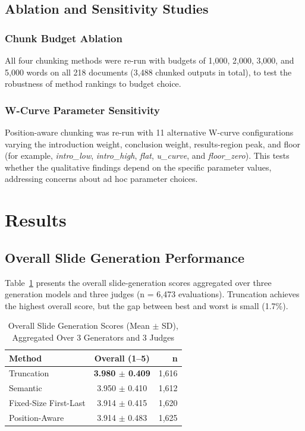 \documentclass{ieeeaccess}
\begin{document}
\subsection{Ablation and Sensitivity Studies}

\subsubsection{Chunk Budget Ablation}

All four chunking methods were re-run with budgets of 1,000, 2,000, 3,000, and 5,000 words on all 218 documents (3,488 chunked outputs in total), to test the robustness of method rankings to budget choice.

\subsubsection{W-Curve Parameter Sensitivity}

Position-aware chunking was re-run with 11 alternative W-curve configurations varying the introduction weight, conclusion weight, results-region peak, and floor (for example, \emph{intro\_low}, \emph{intro\_high}, \emph{flat}, \emph{u\_curve}, and \emph{floor\_zero}). This tests whether the qualitative findings depend on the specific parameter values, addressing concerns about ad hoc parameter choices.

\section{Results}
\label{sec:results}

\subsection{Overall Slide Generation Performance}

Table~\ref{tab:results} presents the overall slide-generation scores aggregated over three generation models and three judges (n = 6,473 evaluations). Truncation achieves the highest overall score, but the gap between best and worst is small (1.7\%).

\begin{table}[h]
\caption{Overall Slide Generation Scores (Mean $\pm$ SD), Aggregated Over 3 Generators and 3 Judges}
\label{tab:results}
\centering
\begin{tabular}{|l|c|r|}
\hline
\textbf{Method} & \textbf{Overall (1--5)} & \textbf{n} \\
\hline
Truncation & \textbf{3.980 $\pm$ 0.409} & 1,616 \\
Semantic & 3.950 $\pm$ 0.410 & 1,612 \\
Fixed-Size First-Last & 3.914 $\pm$ 0.415 & 1,620 \\
Position-Aware & 3.914 $\pm$ 0.483 & 1,625 \\
\hline
\end{tabular}
\end{table}
\end{document}
